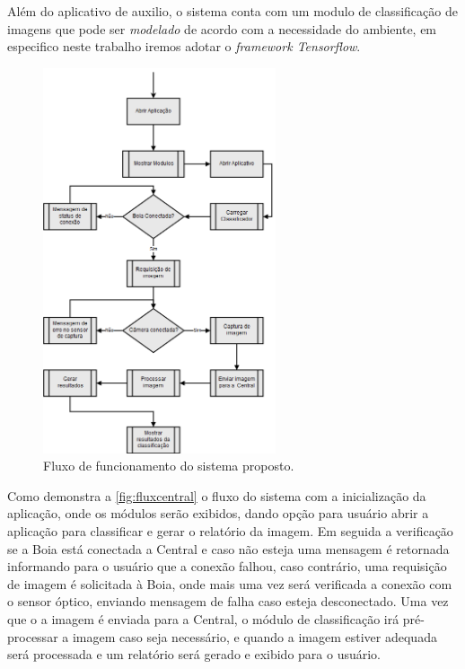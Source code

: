 Além do aplicativo de auxilio, o sistema conta com um modulo de classificação de imagens que pode ser \textit{modelado} de acordo com a necessidade do ambiente, em especifico neste trabalho iremos adotar o \textit{framework Tensorflow}. 



\begin{figure}[ht]
	\caption{\label{fig:fluxcentral}  Fluxo de funcionamento do sistema proposto.}
	 \begin{center}
		\includegraphics[width = 0.61\textwidth]			{resources/Fluxo-central}
    \end{center}
\end{figure}

Como demonstra a \autoref{fig:fluxcentral} o fluxo do sistema com a inicialização da aplicação, onde os módulos serão exibidos, dando opção para usuário abrir a aplicação para classificar e gerar o relatório da imagem. Em seguida a verificação se a Boia está conectada a Central e caso não esteja uma mensagem é retornada informando para o usuário que a conexão falhou, caso contrário, uma requisição de imagem é solicitada à Boia, onde mais uma vez será verificada a conexão com o sensor óptico, enviando mensagem de falha caso esteja desconectado. Uma vez que o a imagem é enviada para a Central, o módulo de classificação irá pré-processar a imagem caso seja necessário, e quando a imagem estiver adequada será processada e um relatório será gerado e exibido para o usuário.

